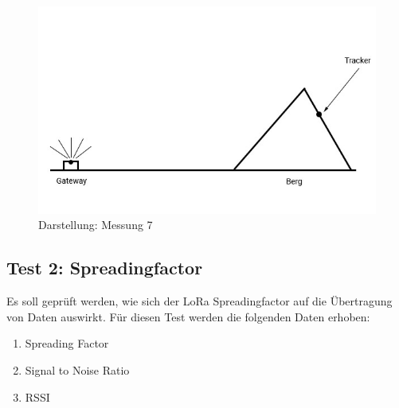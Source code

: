 \documentclass[11pt,english,german]{report}
\theoremstyle{definition}
\begin{document}
\begin{figure}[H]
	\centering
	\includegraphics[width=\textwidth]{img/testing/testing3_graphic.jpg}
	\caption[Darstellung: Messung 7]
	{Darstellung: Messung 7}
\end{figure}

\newpage
\subsection{Test 2: Spreadingfactor}
Es soll geprüft werden, wie sich der LoRa Spreadingfactor auf die Übertragung von Daten auswirkt.
Für diesen Test werden die folgenden Daten erhoben:
\begin{enumerate}
	\item Spreading Factor
	\item Signal to Noise Ratio
	\item RSSI
\end{enumerate}
\end{document}

